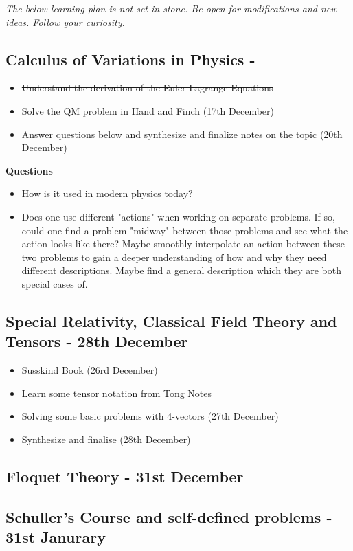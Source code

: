 \textit{The below learning plan is not set in stone. Be open for modifications and new ideas. Follow your curiosity.}
\subsection*{Calculus of Variations in Physics - }   
\begin{itemize}
    \item \sout{Understand the derivation of the Euler-Lagrange Equations}
    \item Solve the QM problem in Hand and Finch (17th December)
    \item Answer questions below and synthesize and finalize notes on the topic (20th December)
\end{itemize}
\textbf{Questions}
\begin{itemize}
    \item How is it used in modern physics today?
    \item Does one use different "actions" when working on separate problems. If so, could one find a problem "midway" between those problems and see what the action looks like there? Maybe smoothly interpolate an action between these two problems to gain a deeper understanding of how and why they need different descriptions. Maybe find a general description which they are both special cases of. 
\end{itemize} 
\subsection*{Special Relativity, Classical Field Theory and Tensors - 28th December}
\begin{itemize}
    \item Susskind Book (26rd December)
    \item Learn some tensor notation from Tong Notes
    \item Solving some basic problems with 4-vectors (27th December)
    \item Synthesize and finalise (28th December)
\end{itemize}
\subsection*{Floquet Theory - 31st December}
\subsection*{Schuller's Course and self-defined problems - 31st Janurary}
